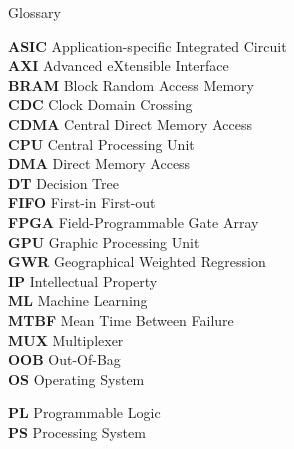 \begin{preface}{Glossary}

  \textbf{ASIC} Application-specific Integrated Circuit\\
  
  \textbf{AXI} Advanced eXtensible Interface\\
  
  \textbf{BRAM} Block Random Access Memory\\
  
  \textbf{CDC} Clock Domain Crossing\\
  
  \textbf{CDMA} Central Direct Memory Access\\
  
  \textbf{CPU} Central Processing Unit \\
  
  \textbf{DMA} Direct Memory Access\\
  
  \textbf{DT} Decision Tree\\
  
  \textbf{FIFO} First-in First-out\\
  
  \textbf{FPGA} Field-Programmable Gate Array\\
  
  \textbf{GPU} Graphic Processing Unit\\
  
  \textbf{GWR} Geographical Weighted Regression \\
  
  \textbf{IP} Intellectual Property\\
  
  \textbf{ML} Machine Learning\\
  
  \textbf{MTBF} Mean Time Between Failure\\
  
  \textbf{MUX} Multiplexer\\
  
  \textbf{OOB} Out-Of-Bag \\
  
  
  \textbf{OS} Operating System\\
  \newpage
  
  \textbf{PL} Programmable Logic\\
  
  \textbf{PS} Processing System\\
  


\end{preface}
